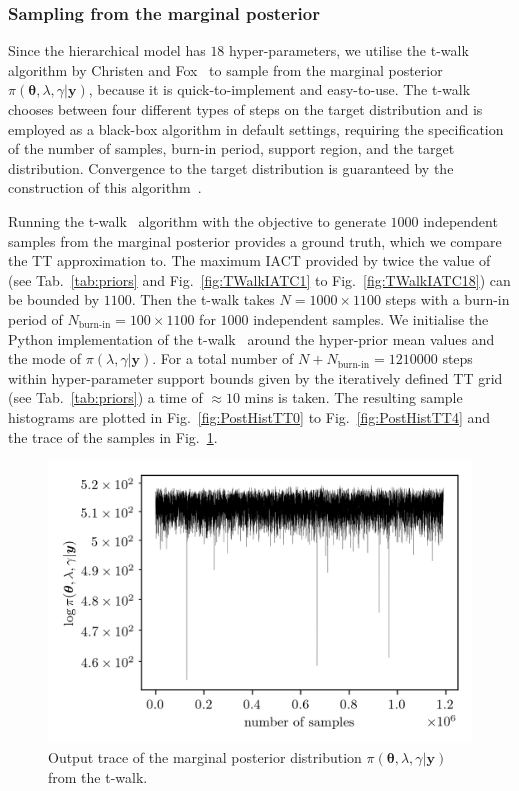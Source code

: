 \subsubsection{Sampling from the marginal posterior}
Since the hierarchical model has $18$ hyper-parameters, we utilise the t-walk algorithm by Christen and Fox~\cite{christen2010general} to sample from the marginal posterior $\pi(\bm{\theta} , \lambda, \gamma| \bm{y})$, because it is quick-to-implement and easy-to-use.
The t-walk chooses between four different types of steps on the target distribution and is employed as a black-box algorithm in default settings, requiring the specification of the number of samples, burn-in period, support region, and the target distribution. 
Convergence to the target distribution is guaranteed by the construction of this algorithm~\cite{christen2010general}.

Running the t-walk~\cite{christen2010general} algorithm with the objective to generate $1000$ independent samples from the marginal posterior provides a ground truth, which we compare the TT approximation to.
The maximum IACT provided by twice the value of \cite{wolff2004monte, drikHesse} (see Tab.~\ref{tab:priors} and Fig.~\ref{fig:TWalkIATC1} to Fig.~\ref{fig:TWalkIATC18}) can be bounded by $1100$.
Then the t-walk takes $N = 1000 \times 1100$ steps with a burn-in period of $N_{\text{burn-in}} = 100 \times 1100 $ for $1000$ independent samples.
We initialise the Python implementation of the t-walk~\cite{christentwalkaccess} around the hyper-prior mean values and the mode of $\pi(\lambda ,\gamma|\bm{y})$.
For a total number of $N + N_{\text{burn-in}} = 1210000$ steps within hyper-parameter support bounds given by the iteratively defined TT grid (see Tab.~\ref{tab:priors}) a time of $\approx 10$ mins is taken.
The resulting sample histograms are plotted in Fig.~\ref{fig:PostHistTT0} to Fig.~\ref{fig:PostHistTT4} and the trace of the samples in Fig.~\ref{fig:TraceTwalk}.
\begin{figure}[ht!]
	\centering
	\includegraphics{TraceTwalk.png}
	\caption[T-walk trace]{Output trace of the marginal posterior distribution $\pi(\bm{\theta},\lambda,\gamma|\bm{y})$ from the t-walk.}
	\label{fig:TraceTwalk}
\end{figure}
\clearpage

